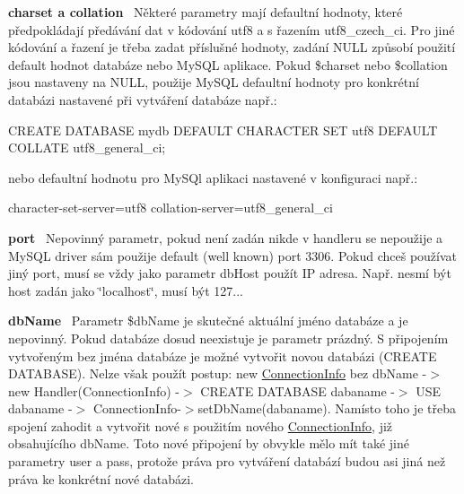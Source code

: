 {\bfseries charset a collation}~\newline
 Některé parametry mají defaultní hodnoty, které předpokládají předávání dat v kódování utf8 a s řazením utf8\+\_\+czech\+\_\+ci. Pro jiné kódování a řazení je třeba zadat příslušné hodnoty, zadání N\+U\+LL způsobí použití default hodnot databáze nebo My\+S\+QL aplikace. Pokud \$charset nebo \$collation jsou nastaveny na N\+U\+LL, použije My\+S\+QL defaultní hodnoty pro konkrétní databázi nastavené při vytváření databáze např.\+:


\begin{DoxyPre}
CREATE DATABASE mydb DEFAULT CHARACTER SET utf8 DEFAULT COLLATE utf8\_general\_ci;
\end{DoxyPre}
 nebo defaultní hodnotu pro My\+S\+Ql aplikaci nastavené v konfiguraci např.\+: 
\begin{DoxyPre}
 [mysqld]
 character-set-server=utf8
 collation-server=utf8\_general\_ci
\end{DoxyPre}
 

{\bfseries port}~\newline
 Nepovinný parametr, pokud není zadán nikde v handleru se nepoužije a My\+S\+QL driver sám použije default (well known) port 3306. Pokud chceš používat jiný port, musí se vždy jako parametr db\+Host použít IP adresa. Např. nesmí být host zadán jako \char`\"{}localhost\char`\"{}, musí být 127...

{\bfseries db\+Name}~\newline
 Parametr \$db\+Name je skutečné aktuální jméno databáze a je nepovinný. Pokud databáze dosud neexistuje je parametr prázdný. S připojením vytvořeným bez jména databáze je možné vytvořit novou databázi (C\+R\+E\+A\+TE D\+A\+T\+A\+B\+A\+SE). Nelze však použít postup\+: new \mbox{\hyperlink{class_pes_1_1_database_1_1_handler_1_1_connection_info}{Connection\+Info}} bez db\+Name -\/$>$ new Handler(\+Connection\+Info) -\/$>$ C\+R\+E\+A\+TE D\+A\+T\+A\+B\+A\+SE dabaname -\/$>$ U\+SE dabaname -\/$>$ Connection\+Info-\/$>$set\+Db\+Name(dabaname). Namísto toho je třeba spojení zahodit a vytvořit nové s použitím nového \mbox{\hyperlink{class_pes_1_1_database_1_1_handler_1_1_connection_info}{Connection\+Info}}, již obsahujícího db\+Name. Toto nové připojení by obvykle mělo mít také jiné parametry user a pass, protože práva pro vytváření databází budou asi jiná než práva ke konkrétní nové databázi.


